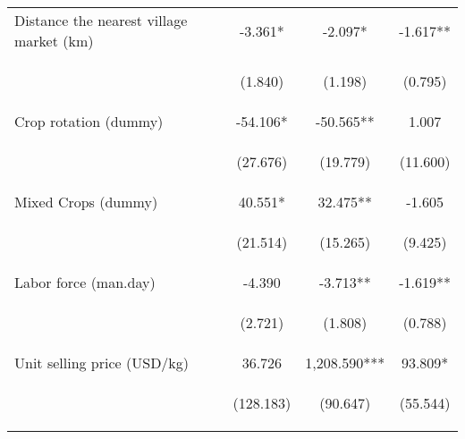 \begin{center}
\begin{tabular}{lccc}
Distance the nearest village market (km) & -3.361* & -2.097* & -1.617** \\
\vspace{4pt} & \begin{footnotesize}(1.840)\end{footnotesize} & \begin{footnotesize}(1.198)\end{footnotesize} & \begin{footnotesize}(0.795)\end{footnotesize} \\
Crop rotation (dummy) & -54.106* & -50.565** & 1.007 \\
\vspace{4pt} & \begin{footnotesize}(27.676)\end{footnotesize} & \begin{footnotesize}(19.779)\end{footnotesize} & \begin{footnotesize}(11.600)\end{footnotesize} \\
Mixed Crops (dummy) & 40.551* & 32.475** & -1.605 \\
\vspace{4pt} & \begin{footnotesize}(21.514)\end{footnotesize} & \begin{footnotesize}(15.265)\end{footnotesize} & \begin{footnotesize}(9.425)\end{footnotesize} \\
Labor force (man.day) & -4.390 & -3.713** & -1.619** \\
\vspace{4pt} & \begin{footnotesize}(2.721)\end{footnotesize} & \begin{footnotesize}(1.808)\end{footnotesize} & \begin{footnotesize}(0.788)\end{footnotesize} \\
Unit selling price (USD/kg) & 36.726 & 1,208.590*** & 93.809* \\
\vspace{4pt} & \begin{footnotesize}(128.183)\end{footnotesize} & \begin{footnotesize}(90.647)\end{footnotesize} & \begin{footnotesize}(55.544)\end{footnotesize} \\

\end{tabular}
\end{center}
